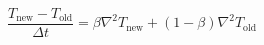\documentclass[preview]{standalone}
\begin{document}
\setcounter{equation}{10}
\begin{equation}
    \frac{T_{\text{new}} - T_{\text{old}}}{\Delta t} = \beta \nabla^2 T_{\text{new}} + (1 - \beta) \nabla^2 T_{\text{old}}
\end{equation}
\end{document}
